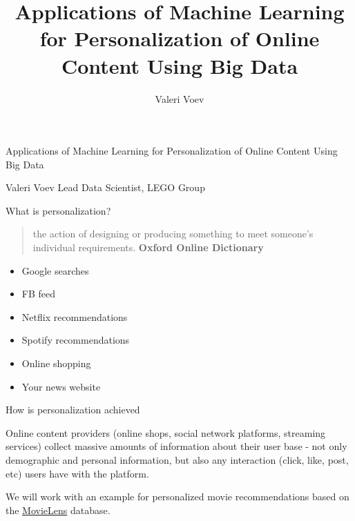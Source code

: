 \documentclass[ignorenonframetext,]{beamer}
\title{Applications of Machine Learning for Personalization of Online Content
Using Big Data}
\author{Valeri Voev}
\date{}
\providecommand{\tightlist}{%
  \setlength{\itemsep}{0pt}\setlength{\parskip}{0pt}}
\begin{document}
\frame{\titlepage}

\begin{frame}{Applications of Machine Learning for Personalization of
Online Content Using Big Data}
\protect\hypertarget{applications-of-machine-learning-for-personalization-of-online-content-using-big-data}{}

Valeri Voev Lead Data Scientist, LEGO Group

\end{frame}

\begin{frame}{What is personalization?}
\protect\hypertarget{what-is-personalization}{}

\begin{quote}
the action of designing or producing something to meet someone's
individual requirements. \textbf{Oxford Online Dictionary}
\end{quote}

\begin{itemize}
\tightlist
\item
  Google searches
\item
  FB feed
\item
  Netflix recommendations
\end{itemize}

\begin{itemize}
\tightlist
\item
  Spotify recommendations
\item
  Online shopping
\item
  Your news website
\end{itemize}

\end{frame}

\begin{frame}{How is personalization achieved}
\protect\hypertarget{how-is-personalization-achieved}{}

Online content providers (online shops, social network platforms,
streaming services) collect massive amounts of information about their
user base - not only demographic and personal information, but also any
interaction (click, like, post, etc) users have with the platform.

We will work with an example for personalized movie recommendations
based on the
\href{https://grouplens.org/datasets/movielens/1m/}{MovieLens} database.

\end{frame}
\end{document}
